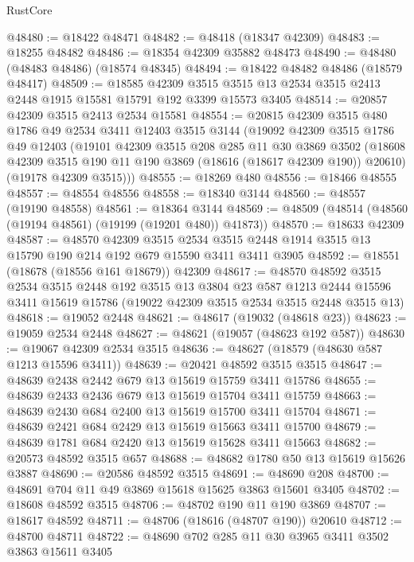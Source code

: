 \begin{lexlean}{RustCore}
\begin{coremodule}
@48480 := @18422 @48471
@48482 := @48418 (@18347 @42309)
@48483 := @18255 @48482
@48486 := @18354 @42309 @35882 @48473
@48490 := @48480 (@48483 @48486) (@18574 @48345)
@48494 := @18422 @48482 @48486 (@18579 @48417)
@48509 := @18585
    @42309
    @3515
    @3515
    @13
    @2534
    @3515
    @2413
    @2448
    @1915
    @15581
    @15791
    @192
    @3399
    @15573
    @3405
@48514 := @20857 @42309 @3515 @2413 @2534 @15581
@48554 := @20815
    @42309
    @3515
    @480
    @1786
    @49
    @2534
    @3411
    @12403
    @3515
    @3144
    (@19092
      @42309
      @3515
      @1786
      @49
      @12403
      (@19101
        @42309
        @3515
        @208
        @285
        @11
        @30
        @3869
        @3502
        (@18608 @42309 @3515 @190 @11 @190 @3869 (@18616 (@18617 @42309 @190)) @20610)
        (@19178 @42309 @3515)))
@48555 := @18269 @480
@48556 := @18466 @48555
@48557 := @48554 @48556
@48558 := @18340 @3144
@48560 := @48557 (@19190 @48558)
@48561 := @18364 @3144
@48569 := @48509 (@48514 (@48560 (@19194 @48561) (@19199 (@19201 @480)) @41873))
@48570 := @18633 @42309
@48587 := @48570
    @42309
    @3515
    @2534
    @3515
    @2448
    @1914
    @3515
    @13
    @15790
    @190
    @214
    @192
    @679
    @15590
    @3411
    @3411
    @3905
@48592 := @18551 (@18678 (@18556 @161 @18679)) @42309
@48617 := @48570
    @48592
    @3515
    @2534
    @3515
    @2448
    @192
    @3515
    @13
    @3804
    @23
    @587
    @1213
    @2444
    @15596
    @3411
    @15619
    @15786
    (@19022 @42309 @3515 @2534 @3515 @2448 @3515 @13)
@48618 := @19052 @2448
@48621 := @48617 (@19032 (@48618 @23))
@48623 := @19059 @2534 @2448
@48627 := @48621 (@19057 (@48623 @192 @587))
@48630 := @19067 @42309 @2534 @3515
@48636 := @48627 (@18579 (@48630 @587 @1213 @15596 @3411))
@48639 := @20421 @48592 @3515 @3515
@48647 := @48639 @2438 @2442 @679 @13 @15619 @15759 @3411 @15786
@48655 := @48639 @2433 @2436 @679 @13 @15619 @15704 @3411 @15759
@48663 := @48639 @2430 @684 @2400 @13 @15619 @15700 @3411 @15704
@48671 := @48639 @2421 @684 @2429 @13 @15619 @15663 @3411 @15700
@48679 := @48639 @1781 @684 @2420 @13 @15619 @15628 @3411 @15663
@48682 := @20573 @48592 @3515 @657
@48688 := @48682 @1780 @50 @13 @15619 @15626 @3887
@48690 := @20586 @48592 @3515
@48691 := @48690 @208
@48700 := @48691 @704 @11 @49 @3869 @15618 @15625 @3863 @15601 @3405
@48702 := @18608 @48592 @3515
@48706 := @48702 @190 @11 @190 @3869
@48707 := @18617 @48592
@48711 := @48706 (@18616 (@48707 @190)) @20610
@48712 := @48700 @48711
@48722 := @48690 @702 @285 @11 @30 @3965 @3411 @3502 @3863 @15611 @3405

\end{coremodule}
\end{lexlean}
